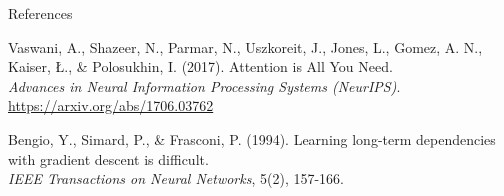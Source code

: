 \begin{frame}[allowframebreaks]{References}
\begin{thebibliography}{99}
Vaswani, A., Shazeer, N., Parmar, N., Uszkoreit, J., Jones, L., Gomez, A. N., Kaiser, Ł., \& Polosukhin, I. (2017). Attention is All You Need.\\
\textit{Advances in Neural Information Processing Systems (NeurIPS)}.\\
\url{https://arxiv.org/abs/1706.03762}

Bengio, Y., Simard, P., \& Frasconi, P. (1994). Learning long-term dependencies with gradient descent is difficult.\\
\textit{IEEE Transactions on Neural Networks}, 5(2), 157-166.

\end{thebibliography}
\end{frame}